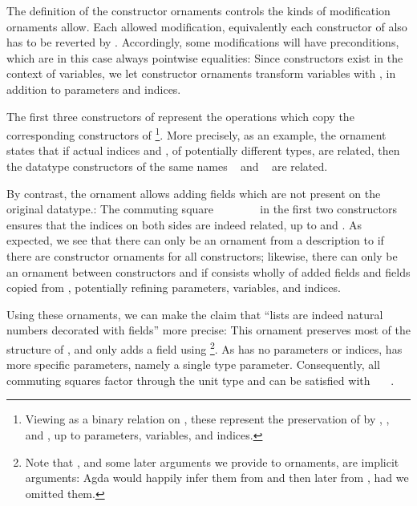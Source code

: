 The definition of the constructor ornaments  controls the kinds of modification ornaments allow. Each allowed modification, equivalently each constructor of  also has to be reverted by . Accordingly, some modifications will have preconditions, which are in this case always pointwise equalities:
Since constructors exist in the context of variables, we let constructor ornaments transform variables with , in addition to parameters and indices.

The first three constructors of  represent the operations which copy the corresponding constructors of \footnote{Viewing  as a binary relation on , these represent the preservation of  by , , and , up to parameters, variables, and indices.}. More precisely, as an example, the ornament  states that if actual indices  and , of potentially different types, are related, then the datatype constructors of the same names \  and \  are related.

By contrast, the  ornament allows adding fields which are not present on the original datatype.:
The commuting square \ \ \ \ \ \ \  in the first two constructors ensures that the indices on both sides are indeed related, up to  and . As expected, we see that there can only be an ornament from a description  to  if there are constructor ornaments for all constructors; likewise, there can only be an ornament between constructors  and  if  consists wholly of added fields and fields copied from , potentially refining parameters, variables, and indices.

Using these ornaments, we can make the claim that ``lists are indeed natural numbers decorated with fields'' more precise:
This ornament preserves most of the structure of \bN{}, and only adds a field  using \footnote{Note that , and some later arguments we provide to ornaments, are implicit arguments: Agda would happily infer them from  and then later from , had we omitted them.}. As \bN{} has no parameters or indices,  has more specific parameters, namely a single type parameter. Consequently, all commuting squares factor through the unit type and can be satisfied with \ \AV{\_}\ \ . 

